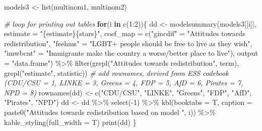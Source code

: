\documentclass[
]{article}
\newenvironment{Shaded}{\begin{snugshade}}{\end{snugshade}}
\newcommand{\AttributeTok}[1]{\textcolor[rgb]{0.77,0.63,0.00}{#1}}
\newcommand{\CommentTok}[1]{\textcolor[rgb]{0.56,0.35,0.01}{\textit{#1}}}
\newcommand{\ControlFlowTok}[1]{\textcolor[rgb]{0.13,0.29,0.53}{\textbf{#1}}}
\newcommand{\DecValTok}[1]{\textcolor[rgb]{0.00,0.00,0.81}{#1}}
\newcommand{\FunctionTok}[1]{\textcolor[rgb]{0.00,0.00,0.00}{#1}}
\newcommand{\NormalTok}[1]{#1}
\newcommand{\OtherTok}[1]{\textcolor[rgb]{0.56,0.35,0.01}{#1}}
\newcommand{\SpecialCharTok}[1]{\textcolor[rgb]{0.00,0.00,0.00}{#1}}
\newcommand{\StringTok}[1]{\textcolor[rgb]{0.31,0.60,0.02}{#1}}
\begin{document}
\begin{Shaded}
\begin{Highlighting}[]
\NormalTok{models3 }\OtherTok{\textless{}{-}} \FunctionTok{list}\NormalTok{(multinom1, multinom2)}


\CommentTok{\# loop for printing out tables}
\ControlFlowTok{for}\NormalTok{(i }\ControlFlowTok{in} \FunctionTok{c}\NormalTok{(}\DecValTok{1}\SpecialCharTok{:}\DecValTok{2}\NormalTok{))\{}
\NormalTok{  dd }\OtherTok{\textless{}{-}} \FunctionTok{modelsummary}\NormalTok{(models3[[i]],}
             \AttributeTok{estimate =} \StringTok{"\{estimate\}\{stars\}"}\NormalTok{, }
             \AttributeTok{coef\_map =} \FunctionTok{c}\NormalTok{(}\StringTok{"gincdif"} \OtherTok{=} \StringTok{"Attitudes towards redistribution"}\NormalTok{,}
                         \StringTok{"feehms"} \OtherTok{=} \StringTok{"LGBT+ people should be free to live as they wish"}\NormalTok{,}
                         \StringTok{"imwbcnt"} \OtherTok{=} \StringTok{"Immigrants make the country a worse/better place to live"}\NormalTok{),}
             \AttributeTok{output =} \StringTok{"data.frame"}\NormalTok{) }\SpecialCharTok{\%\textgreater{}\%} 
  \FunctionTok{filter}\NormalTok{(}\FunctionTok{grepl}\NormalTok{(}\StringTok{"Attitudes towards redistribution"}\NormalTok{, term), }
         \FunctionTok{grepl}\NormalTok{(}\StringTok{"estimate"}\NormalTok{, statistic)) }
\CommentTok{\# add rownames, derived from ESS codebook (CDU/CSU = 1, LINKE = 3, Greens = 4, FDP = 5, AfD = 6, Pirates = 7, NPD = 8)}
\FunctionTok{rownames}\NormalTok{(dd) }\OtherTok{\textless{}{-}} \FunctionTok{c}\NormalTok{(}\StringTok{"CDU/CSU"}\NormalTok{, }\StringTok{"LINKE"}\NormalTok{, }\StringTok{"Greens"}\NormalTok{, }\StringTok{"FDP"}\NormalTok{, }\StringTok{"AfD"}\NormalTok{, }\StringTok{"Pirates"}\NormalTok{, }\StringTok{"NPD"}\NormalTok{)}
\NormalTok{dd }\OtherTok{\textless{}{-}}\NormalTok{ dd }\SpecialCharTok{\%\textgreater{}\%}
  \FunctionTok{select}\NormalTok{(}\SpecialCharTok{{-}}\DecValTok{1}\NormalTok{) }\SpecialCharTok{\%\textgreater{}\%}
  \FunctionTok{kbl}\NormalTok{(}\AttributeTok{booktabs =}\NormalTok{ T, }
      \AttributeTok{caption =} \FunctionTok{paste0}\NormalTok{(}\StringTok{"Attitudes towards redistribution based on model "}\NormalTok{, i)) }\SpecialCharTok{\%\textgreater{}\%}
  \FunctionTok{kable\_styling}\NormalTok{(}\AttributeTok{full\_width =}\NormalTok{ T)}
\FunctionTok{print}\NormalTok{(dd)}
\NormalTok{\}}
\end{Highlighting}
\end{Shaded}
\end{document}
